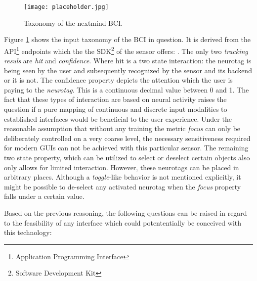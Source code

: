             \begin{figure}[h]     %
                \centering
                \texttt{[image: placeholder.jpg]} 
                \caption{Taxonomy of the nextmind BCI. }\label{bci-taxonomy}
            \end{figure}

            Figure \ref*{bci-taxonomy} shows the input taxonomy of the BCI in question. It is derived from the API\footnote{Application Programming Interface} endpoints which the the SDK\footnote{Software Development Kit} of the sensor offers: \cite{NextMind.18112020}
            . The only two \textit{tracking resuls} are \textit{hit} and \textit{confidence}. Where hit is a two state interaction: the neurotag is being seen by the user and subsequently recognized by the sensor and its backend or it is not. The confidence property depicts the attention which the user is paying to the \textit{neurotag}. This is a continuous decimal value between 0 and 1.
            The fact that these types of interaction are based on neural activity raises the question if a pure mapping of continuous and discrete input modalities to established interfaces would be beneficial to the user experience. Under the reasonable assumption that without any training the metric \textit{focus} can only be deliberately controlled on a very coarse level, the necessary sensitiveness required for modern GUIs can not be achieved with this particular sensor. The remaining two state property, which can be utilized to select or deselect certain objects also only allows for limited interaction. However, these neurotags can be placed in arbitrary places. Although a \textit{toggle}-like behavior is not mentioned explicitly, it might be possible to de-select any activated neurotag when the \textit{focus} property falls under a certain value.

            \bigskip

            Based on the previous reasoning, the following questions can be raised in regard to the feasibility of any interface which could potententially be conceived with this technology:

